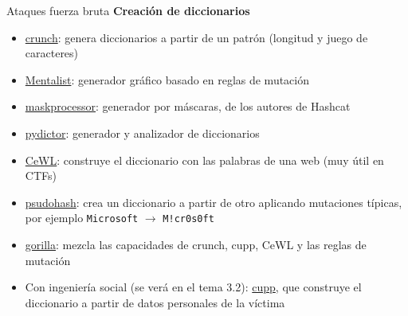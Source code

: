 \documentclass[aspectratio=169,11pt]{beamer}
\newcommand{\cmd}[1]{\texttt{#1}}
\newcommand{\lead}[1]{{\bfseries #1}\par\medskip}
\begin{document}
\begin{frame}[allowframebreaks]{Ataques fuerza bruta}
\small
\lead{Creación de diccionarios}
  \begin{itemize}
  \item \href{https://www.kali.org/tools/crunch/}{crunch}: genera diccionarios a partir de un patrón (longitud y juego de caracteres)
  \item \href{https://github.com/sc0tfree/mentalist}{Mentalist}: generador gráfico basado en reglas de mutación
  \item \href{https://github.com/hashcat/maskprocessor}{maskprocessor}: generador por máscaras, de los autores de Hashcat
  \item \href{https://github.com/LandGrey/pydictor}{pydictor}: generador y analizador de diccionarios
  \item \href{https://github.com/digininja/CeWL}{CeWL}: construye el diccionario con las palabras de una web (muy útil en CTFs)
  \item \href{https://github.com/t3l3machus/psudohash}{psudohash}: crea un diccionario a partir de otro aplicando mutaciones típicas, por ejemplo \cmd{Microsoft} $\rightarrow$ \cmd{M!cr0s0ft}
  \item \href{https://github.com/andreiverse/gorilla}{gorilla}: mezcla las capacidades de crunch, cupp, CeWL y las reglas de mutación
  \item Con ingeniería social (se verá en el tema 3.2): \href{https://github.com/Mebus/cupp}{cupp}, que construye el diccionario a partir de datos personales de la víctima
  \end{itemize}
\end{frame}
\end{document}

